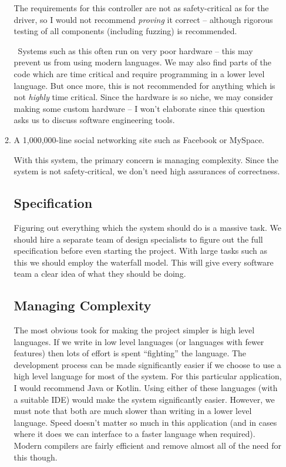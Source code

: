 \documentclass[10pt,\jkfside,a4paper]{article}
\begin{document}
\begin{enumerate}
\begin{enumerate}[label=(\alph*)]
The requirements for this controller are not as safety-critical as for the driver, so I would
not recommend \textit{proving} it correct -- although rigorous testing of all components
(including fuzzing) is recommended.

\dag \ Systems such as this often run on very poor hardware -- this may prevent us from using
modern languages. We may also find parts of the code which are time critical and require
programming in a lower level language. But once more, this is not recommended for anything
which is not \textit{highly} time critical. Since the hardware is so niche, we may consider
making some custom hardware -- I won't elaborate since this question asks us to discuss
software engineering tools.

\item A 1,000,000-line social networking site such as Facebook or MySpace.

With this system, the primary concern is managing complexity. Since the system is not safety-critical, we don't need
high assurances of correctness.

\subsection*{Specification}

Figuring out everything which the system should do is a massive task. We should hire a separate team of design
specialists to figure out the full specification before even starting the project.
With large tasks such as this we should employ the waterfall model. This will give every software team a
clear idea of what they should be doing.

\subsection*{Managing Complexity}

The most obvious took for making the project simpler is high level languages. If we write in low level languages (or
languages with fewer features) then lots of effort is spent ``fighting'' the language. The development process can be
made significantly easier if we choose to use a high level language for most of the system. For this particular
application, I would recommend Java or Kotlin. Using either of these languages (with a suitable IDE) would make the
system significantly easier. However, we must note that both are much slower than writing in a lower level language.
Speed doesn't matter so much in this application (and in cases where it does we can interface to a faster language
when required). Modern compilers are fairly efficient and remove almost all of the need for this though.


\end{enumerate}
\end{enumerate}
\end{document}
